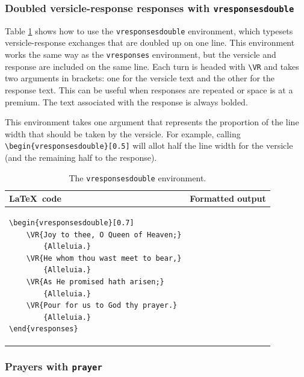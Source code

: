 \documentclass{article}
\begin{document}
\subsubsection{Doubled versicle-response responses with \lstinline{vresponsesdouble}}

Table \ref{tab:env_vresponsesdouble} shows how to use the \lstinline{vresponsesdouble} environment, which typesets versicle-response exchanges that are doubled up on one line. This environment works the same way as the \lstinline{vresponses} environment, but the versicle and response are included on the same line. Each turn is headed with \lstinline{\VR} and takes two arguments in brackets: one for the versicle text and the other for the response text. This can be useful when responses are repeated or space is at a premium. The text associated with the response is always bolded.

This environment takes one argument that represents the proportion of the line width that should be taken by the versicle. For example, calling \lstinline|\begin{vresponsesdouble}[0.5]| will allot half the line width for the versicle (and the remaining half to the response).

\begin{table}[h]
\centering
\begin{tabular}{ll}
\toprule
\LaTeX\ code & Formatted output \\
\midrule
\begin{lstlisting}
\begin{vresponsesdouble}[0.7]
	\VR{Joy to thee, O Queen of Heaven;}
		{Alleluia.}
	\VR{He whom thou wast meet to bear,}
		{Alleluia.}
	\VR{As He promised hath arisen;}
		{Alleluia.}
	\VR{Pour for us to God thy prayer.}
		{Alleluia.}
\end{vresponses}
\end{lstlisting}
&
\sabon{
\begin{vresponsesdoubleex}[0.2]
	\VR{Joy to thee, O Queen of Heaven;}{Alleluia.}
	\VR{He whom thou wast meet to bear,}{Alleluia.}
	\VR{As He promised hath arisen;}{Alleluia.}
	\VR{Pour for us to God thy prayer.}{Alleluia.}
\end{vresponsesdoubleex}
}
\\
\bottomrule
\end{tabular}
\caption{The \lstinline{vresponsesdouble} environment.}
\label{tab:env_vresponsesdouble}
\end{table}

\subsubsection{Prayers with \lstinline{prayer}}
\end{document}
